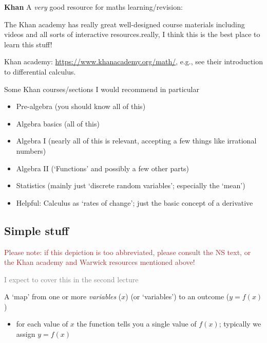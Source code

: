 \documentclass[]{article}
\providecommand{\tightlist}{%
  \setlength{\itemsep}{0pt}\setlength{\parskip}{0pt}}
\begin{document}
\textbf{Khan} A \emph{very} good resource for maths learning/revision:

The Khan academy has really great well-designed course materials
including videos and all sorts of interactive resources.really, I think
this is the best place to learn this stuff!

Khan academy: \url{https://www.khanacademy.org/math/}, e.g., see their
introduction to differential calculus.

Some Khan courses/sections I would recommend in particular

\begin{itemize}
\item
  Pre-algebra (you should know all of this)
\item
  Algebra basics (all of this)
\item
  Algebra I (nearly all of this is relevant, accepting a few things like
  irrational numbers)
\item
  Algebra II (`Functions' and possibly a few other parts)
\item
  Statistics (mainly just `discrete random variables'; especially the
  `mean')
\item
  Helpful: Calculus as `rates of change'; just the basic concept of a
  derivative
\end{itemize}

\hypertarget{simple-stuff}{%
\subsection{Simple stuff}\label{simple-stuff}}

\textcolor{brown}{Please note: if this depiction is too abbreviated, please consult the NS text, or the Khan academy and Warwick resources mentioned above!}

\textcolor{gray}{I expect to cover this in the second lecture}

\begin{description}
\tightlist
\item[(Univariate) Function]
A `map' from one or more \emph{variables} (\(x\)) (or `variables') to an
outcome (\(y=f(x)\))
\end{description}

\begin{itemize}
\tightlist
\item
  for each value of \(x\) the function tells you a single value of
  \(f(x)\); typically we assign \(y=f(x)\)
\end{itemize}
\end{document}
